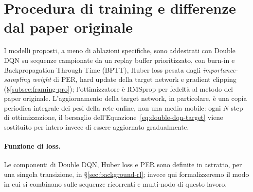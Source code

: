 \section{Procedura di training e differenze dal paper originale}
\label{sec:training}

I modelli proposti, a meno di ablazioni specifiche, sono addestrati con Double DQN su sequenze campionate da un replay
buffer prioritizzato, con burn-in e Backpropagation Through Time (BPTT), Huber loss pesata dagli
\emph{importance-sampling weight} di PER, hard update della target network e
gradient clipping (§\ref{subsec:framing-pro}); l'ottimizzatore è RMSprop
per fedeltà al metodo del paper originale. L'aggiornamento della target
network, in particolare, è una copia periodica integrale dei pesi della
rete online, non una media mobile: ogni $N$ step di ottimizzazione, il
bersaglio dell'Equazione~\ref{eq:double-dqn-target} viene sostituito per
intero invece di essere aggiornato gradualmente.

\paragraph{Funzione di loss.}
Le componenti di Double DQN, Huber loss e PER
sono definite in astratto, per una singola transizione, in
§\ref{sec:background-rl}; invece qui formalizzeremo il modo in cui si combinano sulle sequenze
ricorrenti e multi-nodo di questo lavoro.

